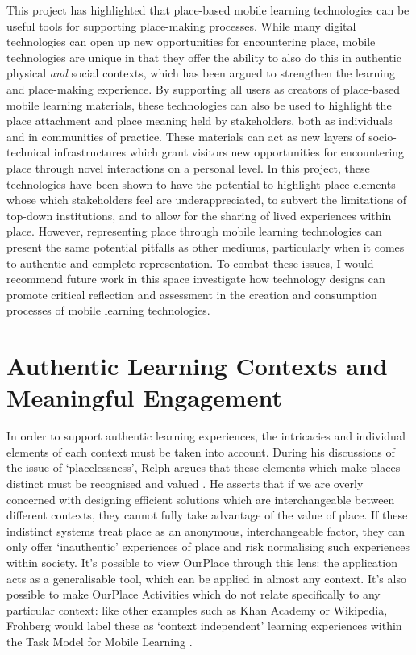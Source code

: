 This project has highlighted that place-based mobile learning technologies can be useful tools for supporting place-making processes. While many digital technologies can open up new opportunities for encountering place, mobile technologies are unique in that they offer the ability to also do this in authentic physical \textit{and} social contexts, which has been argued to strengthen the learning and place-making experience. By supporting all users as creators of place-based mobile learning materials, these technologies can also be used to highlight the place attachment and place meaning held by stakeholders, both as individuals and in communities of practice. These materials can act as new layers of socio-technical infrastructures which grant visitors new opportunities for encountering place through novel interactions on a personal level. In this project, these technologies have been shown to have the potential to highlight place elements whose which stakeholders feel are underappreciated, to subvert the limitations of top-down institutions, and to allow for the sharing of lived experiences within place. However, representing place through mobile learning technologies can present the same potential pitfalls as other mediums, particularly when it comes to authentic and complete representation. To combat these issues, I would recommend future work in this space investigate how technology designs can promote critical reflection and assessment in the creation and consumption processes of mobile learning technologies.

\section{Authentic Learning Contexts and Meaningful Engagement}

In order to support authentic learning experiences, the intricacies and individual elements of each context must be taken into account. During his discussions of the issue of `placelessness', Relph argues that these elements which make places distinct must be recognised and valued \citep{Relph1976}. He asserts that if we are overly concerned with designing efficient solutions which are interchangeable between different contexts, they cannot fully take advantage of the value of place. If these indistinct systems treat place as an anonymous, interchangeable factor, they can only offer `inauthentic' experiences of place and risk normalising such experiences within society. It's possible to view OurPlace through this lens: the application acts as a generalisable tool, which can be applied in almost any context. It's also possible to make OurPlace Activities which do not relate specifically to any particular context: like other examples such as Khan Academy or Wikipedia, Frohberg would label these as `context independent' learning experiences within the Task Model for Mobile Learning \citep{Frohberg2009, Taylor2006}. 

